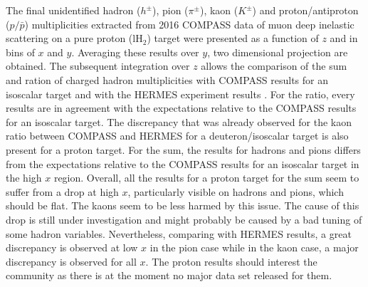 The final unidentified hadron ($h^{\pm}$), pion ($\pi^{\pm}$), kaon ($K^{\pm}$) and proton/antiproton ($p/\bar{p}$) multiplicities extracted from 2016 COMPASS data of muon deep inelastic scattering on a pure proton (lH$_2$) target were presented as a function of $z$ and in bins of $x$ and $y$. Averaging these results over $y$, two dimensional projection are obtained. The subsequent integration over $z$ allows the comparison of the sum and ration of charged hadron multiplicities with COMPASS results for an isoscalar target \cite{COMPASS2006Pi,COMPASS2006K} and with the HERMES experiment results \cite{HERMESMult}. For the ratio, every results are in agreement with the expectations relative to the COMPASS results for an isoscalar target. The discrepancy that was already observed for the kaon ratio between COMPASS and HERMES for a deuteron/isoscalar target is also present for a proton target. For the sum, the results for hadrons and pions differs from the expectations relative to the COMPASS results for an isoscalar target in the high $x$ region. Overall, all the results for a proton target for the sum seem to suffer from a drop at high $x$, particularly visible on hadrons and pions, which should be flat. The kaons seem to be less harmed by this issue. The cause of this drop is still under investigation and might probably be caused by a bad tuning of some hadron variables. Nevertheless, comparing with HERMES results, a great discrepancy is observed at low $x$ in the pion case while in the kaon case, a major discrepancy is observed for all $x$. The proton results should interest the community as there is at the moment no major data set released for them.
